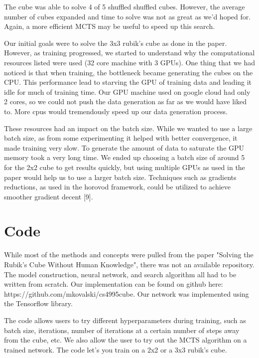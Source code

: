 \documentclass[10pt,twocolumn,letterpaper]{article}
\begin{document}
The cube was able to solve 4 of 5 shuffled shuffled cubes. However, the average number of cubes expanded and time to solve was not as great as we'd hoped for. Again, a more efficient MCTS may be useful to speed up this search.

Our initial goals were to solve the 3x3 rubik's cube as done in the paper. However, as training progressed, we started to understand why the computational resources listed were used (32 core machine with 3 GPUs). One thing that we had noticed is that when training, the bottleneck became generating the cubes on the CPU. This performance lead to starving the GPU of training data and leading it idle for much of training time. Our GPU machine used on google cloud had only 2 cores, so we could not push the data generation as far as we would have liked to. More cpus would tremendously speed up our data generation process.

These resources had an impact on the batch size. While we wanted to use a large batch size, as from some experimenting it helped with better convergence, it made training very slow. To generate the amount of data to saturate the GPU memory took a very long time. We ended up choosing a batch size of around 5 for the 2x2 cube to get results quickly, but using multiple GPUs as used in the paper would help us to use a larger batch size. Techniques such as gradients reductions, as used in the horovod framework, could be utilized to achieve smoother gradient decent [9].




\section{Code}

While most of the methods and concepts were pulled from the paper "Solving the Rubik’s Cube Without Human Knowledge", there was not an available repository.  The model construction, neural network, and search algorithm all had to be written from scratch.  Our implementation can be found on github here: https://github.com/mkovalski/cs4995\textunderscore cube.  Our network was implemented using the Tensorflow library. 

The code allows users to try different hyperparameters during training, such as batch size, iterations, number of iterations at a certain number of steps away from the cube, etc.   We also allow the user to try out the MCTS algorithm on a trained network. The code let's you train on a 2x2 or a 3x3 rubik's cube. 
\end{document}
